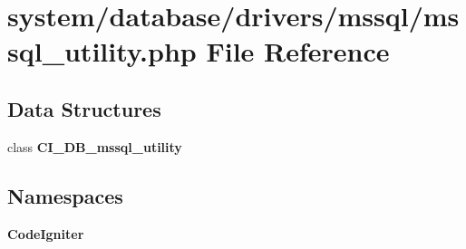 \section{system/database/drivers/mssql/mssql\-\_\-utility.php File Reference}
\label{mssql__utility_8php}
\subsection*{Data Structures}
\begin{DoxyCompactItemize}
\item 
class {\bf C\-I\-\_\-\-D\-B\-\_\-mssql\-\_\-utility}
\end{DoxyCompactItemize}
\subsection*{Namespaces}
\begin{DoxyCompactItemize}
\item 
{\bf Code\-Igniter}
\end{DoxyCompactItemize}
